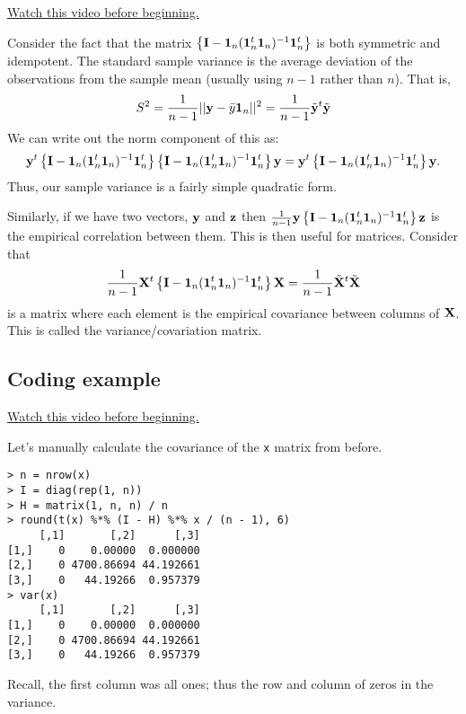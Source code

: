 \href{https://www.youtube.com/watch?v=hTVkDOojbdw&index=5&list=PLpl-gQkQivXhdgUCdaUQcdb31CRe8Mm2y}{Watch this video before beginning.}


Consider the fact that the matrix $\left\{ \mathbf{I} - \mathbf{1}_n (\mathbf{1}_n^t \mathbf{1}_n)^{-1} \mathbf{1}_n^t \right\}$
is both symmetric and idempotent. The standard sample variance is the average deviation of the
observations from the sample mean (usually using $n-1$ rather than $n$). That is,
$$
S^2 = \frac{1}{n-1}|| \mathbf{y} - \bar y \mathbf{1}_n ||^2 = \frac{1}{n-1} \tilde {\mathbf{y}}^t \tilde {\mathbf{y}}
$$
We can write out the norm component of this as: 
$$
\mathbf{y}^t \left\{ \mathbf{I} - \mathbf{1}_n (\mathbf{1}_n^t \mathbf{1}_n)^{-1} \mathbf{1}_n^t \right\}
\left\{ \mathbf{I} - \mathbf{1}_n (\mathbf{1}_n^t \mathbf{1}_n)^{-1} \mathbf{1}_n^t \right\} \mathbf{y}
= \mathbf{y}^t \left\{ \mathbf{I} - \mathbf{1}_n (\mathbf{1}_n^t \mathbf{1}_n)^{-1} \mathbf{1}_n^t \right\}\mathbf{y}.
$$
Thus, our sample variance is a fairly simple quadratic form. 

Similarly, if we have two vectors, $\mathbf{y}$ and $\mathbf{z}$ then $\frac{1}{n-1}\mathbf{y} \left\{ \mathbf{I} - \mathbf{1}_n (\mathbf{1}_n^t \mathbf{1}_n)^{-1} \mathbf{1}_n^t \right\} \mathbf{z}$ is the
empirical correlation between them.
This is then useful for matrices. Consider that
$$
\frac{1}{n-1} \mathbf{X}^t \left\{ \mathbf{I} - \mathbf{1}_n (\mathbf{1}_n^t \mathbf{1}_n)^{-1} \mathbf{1}_n^t \right\} \mathbf{X}
= \frac{1}{n-1} \tilde {\mathbf{X}}^t \tilde {\mathbf{X}}
$$
is a matrix where each element is the empirical covariance between columns of $\mathbf{X}$.
This is called the variance/covariation matrix. 

\subsection{Coding example}

\href{https://www.youtube.com/watch?v=_AHZIy8PRmU&list=PLpl-gQkQivXhdgUCdaUQcdb31CRe8Mm2y&index=6}{Watch this video before beginning.}

Let's manually calculate the covariance of the \texttt{x} matrix from before.

\begin{verbatim}
> n = nrow(x)
> I = diag(rep(1, n))
> H = matrix(1, n, n) / n
> round(t(x) %*% (I - H) %*% x / (n - 1), 6)
     [,1]       [,2]      [,3]
[1,]    0    0.00000  0.000000
[2,]    0 4700.86694 44.192661
[3,]    0   44.19266  0.957379
> var(x)
     [,1]       [,2]      [,3]
[1,]    0    0.00000  0.000000
[2,]    0 4700.86694 44.192661
[3,]    0   44.19266  0.957379
\end{verbatim}
Recall, the first column was all ones; thus the row and column of zeros in the variance.





